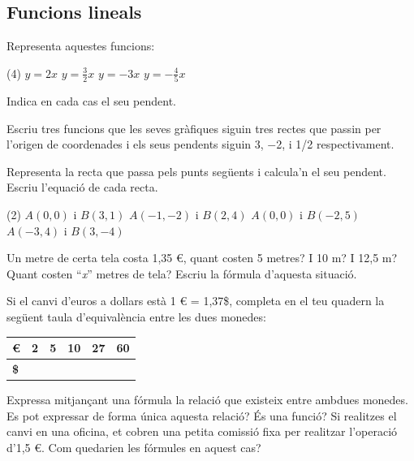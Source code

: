  


\subsection{Funcions lineals}

\begin{mylist}	
	
	\exer Representa aquestes funcions:
	\begin{tasks}(4)
		\task $y=2x$
		\task $y=\frac{3}{2}x$
		\task $y=-3x$
		\task $y=-\frac{4}{5}x$
	\end{tasks}
Indica en cada cas el seu pendent.
\answers{[$m=2$, $m=\frac{3}{2}$, $m=-3$, $m=\frac{-4}{5}$]}
	
	\exer  Escriu tres funcions que les seves gràfiques siguin tres rectes que passin per l'origen de coordenades i els seus pendents siguin 3, $-$2, i 1/2 respectivament.
	
	\exer Representa la recta que passa pels punts següents i calcula'n el seu pendent. Escriu l'equació de cada recta.
		\begin{tasks}(2)
		\task $A(0, 0)$ i $B(3, 1)$
		\task $A(-1, -2)$ i $B(2, 4)$
		\task $A(0, 0)$ i $B(-2, 5)$
		\task $A(-3, 4)$ i $B(3, -4)$
	\end{tasks}

\answers{[$m=\frac{1}{3}$; $y=\frac{1}{3}x$, $m=2$; $y=2x$, $m=-5/2$; $y=-\frac{5}{2}x$, $m=-4/3$; $y=-\frac{4}{3}x$]}
 
\exer  Un metre de certa tela costa 1,35 €, quant costen 5 metres? I 10 m? I 12,5 m? Quant costen ``\textit{x}'' metres de tela? Escriu la fórmula d'aquesta situació.


\exer  Si el canvi d'euros a dollars està 1 € = 1,37\$, completa en el teu quadern la següent taula d'equivalència entre les dues monedes:

\begin{longtable}{|p{0.2in}|p{0.6in}|p{0.6in}|p{0.6in}|p{0.6in}|p{0.6in}|} \hline 
	\cellcolor{lightgray}\textbf{\euro{}} & 2 & 5 & 10 & 27 & 60 \\ [0.3cm] \hline 
	\cellcolor{lightgray}\textbf{\$} &  &  &  &  &  \\ [0.3cm] \hline 
\end{longtable}
Expressa mitjançant una fórmula la relació que existeix entre ambdues monedes. Es pot expressar de forma única aquesta relació? És una funció? Si realitzes el canvi en una oficina, et cobren una petita comissió fixa per realitzar l'operació d'1,5 €. Com quedarien les fórmules en aquest cas?


\end{mylist}

